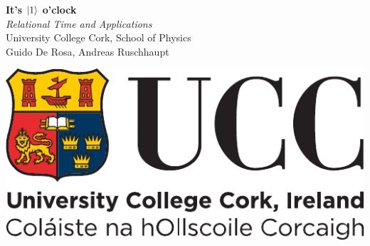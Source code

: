 \documentclass[a0,portrait]{a0poster}
\begin{document}

\begin{minipage}[c]{0.70\linewidth}
\VeryHuge\color{NavyBlue}\textbf{It's $\ket{1}$ o'clock} \color{Black}\\[0.5cm] %
\huge\textit{Relational Time and Applications}\\[1cm] %
\huge University College Cork, School of Physics\\[0.66cm] %
\Large{Guido De Rosa, Andreas Ruschhaupt}

\end{minipage}%
%
\begin{minipage}[t]{0.30\linewidth}
\includegraphics[width=18cm]{ucc_logo.pdf}\\  %
\end{minipage}

\vspace{2cm} %

\end{document}
